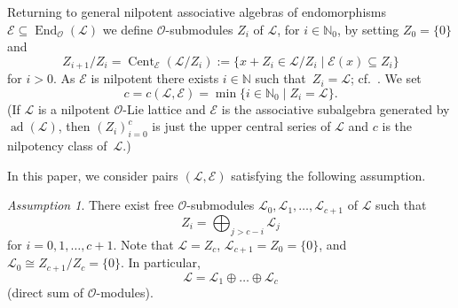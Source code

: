 \documentclass[11pt]{amsart}
\numberwithin{equation}{section}
\numberwithin{figure}{section}
\theoremstyle{plain}
\theoremstyle{definition}
\theoremstyle{remark}
\newtheorem{assumption}{Assumption}[section]
\begin{document}
Returning to general nilpotent associative algebras of endomorphisms
${\mathcal{E}}\subseteq \operatorname{End}_{\ensuremath{\mathcal{O}}}({\ensuremath{\mathcal{L}}})$ we define ${\ensuremath{\mathcal{O}}}$-submodules $Z_i$ of
${\ensuremath{\mathcal{L}}}$, for $i\in{\ensuremath{\mathbb{N}}}_0$, by setting $Z_0=\{0\}$ and
$$Z_{i+1}/Z_i = \operatorname{Cent}_{\mathcal{E}}({\ensuremath{\mathcal{L}}}/Z_i):= \{x + Z_i \in {\ensuremath{\mathcal{L}}}/Z_i \mid
{\mathcal{E}}(x)\subseteq Z_i\}$$ for $i>0$. As ${\mathcal{E}}$ is nilpotent there
exists $i\in{\ensuremath{\mathbb{N}}}$ such that~$Z_i={\ensuremath{\mathcal{L}}}$; cf.\ \cite[Chapter~2,
  Section~II]{Jacobson/79}. We set $$c=c({\ensuremath{\mathcal{L}}},{\mathcal{E}})= \min\{i\in{\ensuremath{\mathbb{N}}}_0
\mid Z_i = {\ensuremath{\mathcal{L}}}\}.$$ (If ${\ensuremath{\mathcal{L}}}$ is a nilpotent ${\ensuremath{\mathcal{O}}}$-Lie lattice and
${\mathcal{E}}$ is the associative subalgebra generated by $\operatorname{ad}({\ensuremath{\mathcal{L}}})$, then
$(Z_i)_{i=0}^c$ is just the upper central series of ${\ensuremath{\mathcal{L}}}$ and $c$ is
the nilpotency class of~${\ensuremath{\mathcal{L}}}$.)

In this paper, we consider pairs $({\ensuremath{\mathcal{L}}},{\mathcal{E}})$ satisfying the
following assumption.

\begin{assumption}\label{ass}
  There exist free ${\ensuremath{\mathcal{O}}}$-submodules ${\ensuremath{\mathcal{L}}}_0,{\ensuremath{\mathcal{L}}}_1,\dots,{\ensuremath{\mathcal{L}}}_{c+1}$
  of ${\ensuremath{\mathcal{L}}}$ such that
\begin{equation*}
Z_i = \bigoplus_{j > c-i}{\ensuremath{\mathcal{L}}}_j
\end{equation*}
for $i=0,1,\dots,c+1$. Note that ${\ensuremath{\mathcal{L}}} = Z_c$, ${\ensuremath{\mathcal{L}}}_{c+1}=Z_0 =
\{0\}$, and ${\ensuremath{\mathcal{L}}}_0 \cong Z_{c+1}/Z_c=\{0\}$. In particular,
\begin{equation*}
  {\ensuremath{\mathcal{L}}}  = {\ensuremath{\mathcal{L}}}_1 \oplus \dots \oplus {\ensuremath{\mathcal{L}}}_c
\end{equation*}
(direct sum of ${\ensuremath{\mathcal{O}}}$-modules).
\end{assumption}
\end{document}
